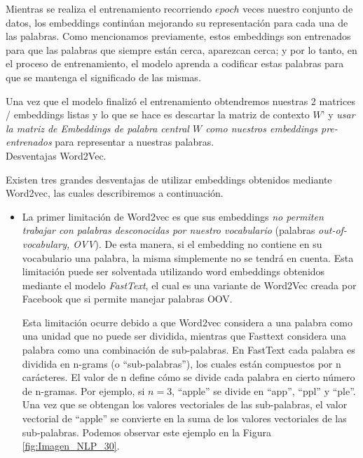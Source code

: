 \documentclass[12pt,a4paper]{article}
\makeatletter
\renewcommand\paragraph{\@startsection{paragraph}{4}{\z@}
            {-2.5ex\@plus -1ex \@minus -.25ex}
            {1.25ex \@plus .25ex}
            {\normalfont\normalsize\bfseries}}
\makeatother
\begin{document}
\begin{sloppypar}
Mientras se realiza el entrenamiento recorriendo $epoch$ veces nuestro conjunto de datos, los embeddings continúan mejorando su representación para cada una de las palabras. Como mencionamos previamente, estos embeddings son entrenados para que las palabras que siempre están cerca, aparezcan cerca; y por lo tanto, en el proceso de entrenamiento, el modelo aprenda a codificar estas palabras para que se mantenga el significado de las mismas. 

Una vez que el modelo finalizó el entrenamiento obtendremos nuestras 2 matrices / embeddings listas y lo que se hace es descartar la matriz de contexto $W’$ y \textit{usar la matriz de Embeddings de palabra central $W$ como nuestros embeddings pre-entrenados} para representar a nuestras palabras. 
\\

\paragraph{Desventajas Word2Vec.}\label{desv_word2vec}

Existen tres grandes desventajas de utilizar embeddings obtenidos mediante Word2vec, las cuales describiremos a continuación.

\begin{itemize}
\item La primer limitación\cite{NLP_28} de Word2vec es que sus embeddings \textit{no permiten trabajar con palabras desconocidas por nuestro vocabulario} (palabras \textit{out-of-vocabulary, OVV}). De esta manera, si el embedding no contiene en su vocabulario una palabra, la misma simplemente no se tendrá en cuenta. Esta limitación puede ser solventada utilizando word embeddings obtenidos mediante el modelo \textit{FastText}, el cual es una variante de Word2Vec creada por Facebook que si permite manejar palabras OOV. 

Esta limitación ocurre debido a que Word2vec considera a una palabra como una unidad que no puede ser dividida, mientras que Fasttext considera una palabra como una combinación de sub-palabras. En FastText cada palabra es dividida en n-grams (o “sub-palabras”), los cuales están compuestos por n carácteres. El valor de n define cómo se divide cada palabra en cierto número de n-gramas. Por ejemplo, si $n=3$, “apple” se divide en “app”, “ppl” y “ple”. Una vez que se obtengan los valores vectoriales de las sub-palabras, el valor vectorial de “apple” se convierte en la suma de los valores vectoriales de las sub-palabras. Podemos observar este ejemplo en la Figura \ref{fig:Imagen_NLP_30}.


\end{itemize}
\end{sloppypar}
\end{document}
